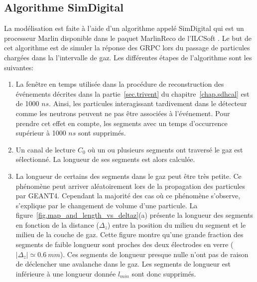 \subsection{Algorithme SimDigital}
\label{sec.algo}
La modélisation est faite à l'aide d'un algorithme appelé SimDigital qui est un processeur Marlin \cite{marlin} disponible dans le paquet MarlinReco \cite{marlinreco} de l'ILCSoft \cite{ilcsoft}. Le but de cet algorithme est de simuler la réponse des GRPC lors du passage de particules chargées dans la l'intervalle de gaz. Les différentes étapes de l’algorithme sont les suivantes:
\begin{enumerate}[~~1-]
\item La fenêtre en temps utilisée dans la procédure de reconstruction des événements décrites dans la partie~\ref{sec.trivent} du chapitre~\ref{chap.sdhcal} est de 1000 $ns$. Ainsi, les particules interagissant tardivement dans le détecteur comme les neutrons peuvent ne pas être associées à l’événement. Pour prendre cet effet en compte, les segments avec un temps d’occurrence supérieur à 1000 $ns$ sont supprimés.
\item \label{it.start} Un canal de lecture $C_0$ où un ou plusieurs segments ont traversé le gaz est sélectionné. La longueur de ses segments est alors calculée.
\item La longueur de certains des segments dans le gaz peut être très petite. Ce phénomène peut arriver aléatoirement lors de la propagation des particules par GEANT4. Cependant la majorité des cas où ce phénomène s'observe, s'explique par le changement de volume d'une particule. La figure~\ref{fig.map_and_length_vs_deltaz}(a) présente la longueur des segments en fonction de la distance ($\Delta_z$) entre la position du milieu du segment et le milieu de la couche de gaz. Cette figure montre qu'une grande fraction des segments de faible longueur sont proches des deux électrodes en verre ($|\Delta_z|\simeq0.6~mm$). Ces segments de longueur presque nulle n'ont pas de raison de déclencher une avalanche dans le gaz. Les segments de longueur est inférieure à une longueur donnée $l_{min}$ sont donc supprimés.
  \begin{figure}[!ht]

\end{figure}
\end{enumerate}

